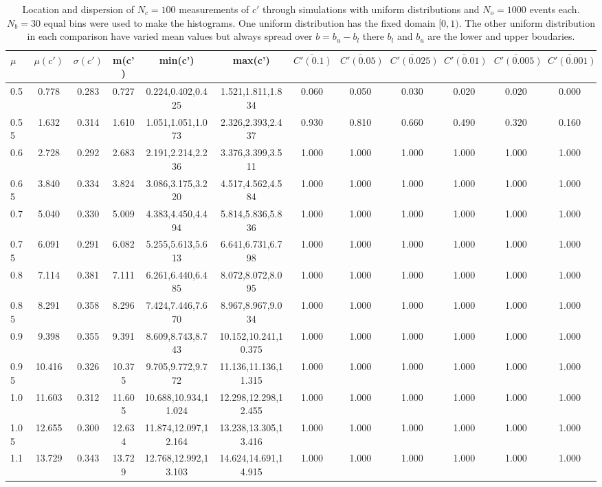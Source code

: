 \begin{table*}[!h]
\begin{center}
\begin{tabular}{| l | c | c | c | c | c | c | c | c | c | c | c |}\hline
$\mu$ & $\mu(c')$ & $\sigma(c')$ & m(c') & min(c') & max(c') & $\overline{C'(0.1)}$ & $\overline{C'(0.05)}$ & $\overline{C'(0.025)}$ & $\overline{C'(0.01)}$ & $\overline{C'(0.005)}$ & $\overline{C'(0.001)}$ \\\hline
0.5 & 0.778 & 0.283 & 0.727 & 0.224,0.402,0.425 & 1.521,1.811,1.834  & 0.060  & 0.050  & 0.030  & 0.020  & 0.020  & 0.000 \\\hline
0.55 & 1.632 & 0.314 & 1.610 & 1.051,1.051,1.073 & 2.326,2.393,2.437  & 0.930  & 0.810  & 0.660  & 0.490  & 0.320  & 0.160 \\\hline
0.6 & 2.728 & 0.292 & 2.683 & 2.191,2.214,2.236 & 3.376,3.399,3.511  & 1.000  & 1.000  & 1.000  & 1.000  & 1.000  & 1.000 \\\hline
0.65 & 3.840 & 0.334 & 3.824 & 3.086,3.175,3.220 & 4.517,4.562,4.584  & 1.000  & 1.000  & 1.000  & 1.000  & 1.000  & 1.000 \\\hline
0.7 & 5.040 & 0.330 & 5.009 & 4.383,4.450,4.494 & 5.814,5.836,5.836  & 1.000  & 1.000  & 1.000  & 1.000  & 1.000  & 1.000 \\\hline
0.75 & 6.091 & 0.291 & 6.082 & 5.255,5.613,5.613 & 6.641,6.731,6.798  & 1.000  & 1.000  & 1.000  & 1.000  & 1.000  & 1.000 \\\hline
0.8 & 7.114 & 0.381 & 7.111 & 6.261,6.440,6.485 & 8.072,8.072,8.095  & 1.000  & 1.000  & 1.000  & 1.000  & 1.000  & 1.000 \\\hline
0.85 & 8.291 & 0.358 & 8.296 & 7.424,7.446,7.670 & 8.967,8.967,9.034  & 1.000  & 1.000  & 1.000  & 1.000  & 1.000  & 1.000 \\\hline
0.9 & 9.398 & 0.355 & 9.391 & 8.609,8.743,8.743 & 10.152,10.241,10.375  & 1.000  & 1.000  & 1.000  & 1.000  & 1.000  & 1.000 \\\hline
0.95 & 10.416 & 0.326 & 10.375 & 9.705,9.772,9.772 & 11.136,11.136,11.315  & 1.000  & 1.000  & 1.000  & 1.000  & 1.000  & 1.000 \\\hline
1.0 & 11.603 & 0.312 & 11.605 & 10.688,10.934,11.024 & 12.298,12.298,12.455  & 1.000  & 1.000  & 1.000  & 1.000  & 1.000  & 1.000 \\\hline
1.05 & 12.655 & 0.300 & 12.634 & 11.874,12.097,12.164 & 13.238,13.305,13.416  & 1.000  & 1.000  & 1.000  & 1.000  & 1.000  & 1.000 \\\hline
1.1 & 13.729 & 0.343 & 13.729 & 12.768,12.992,13.103 & 14.624,14.691,14.915  & 1.000  & 1.000  & 1.000  & 1.000  & 1.000  & 1.000 \\\hline
\end{tabular}
\caption{Location and dispersion of $N_c=100$
measurements of $c'$ through simulations
with uniform distributions and $N_o=1000$ events each.
$N_b=30$ equal bins were used to make the histograms.
One uniform distribution has the fixed domain $[0,1)$.
The other uniform distribution in each comparison
have varied mean values but always
spread over $b=b_u-b_l$ there $b_l$ and $b_u$ are the lower and upper boudaries.}
\end{center}
\end{table*}
